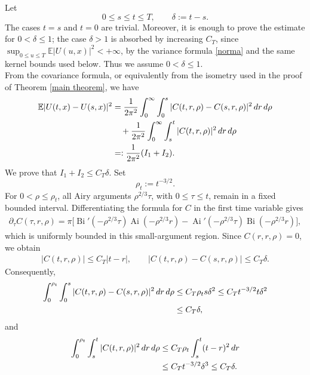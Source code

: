 \documentclass{article}
\newcommand{\Ai}{\operatorname{Ai}}
\newcommand{\Bi}{\operatorname{Bi}}
\begin{document}
Let
\[
  0\le s\le t\le T,
  \qquad
  \delta:=t-s.
\]
The cases \(t=s\) and \(t=0\) are trivial.  Moreover, it is enough to prove the
estimate for \(0<\delta\le1\); the case \(\delta>1\) is absorbed by increasing
\(C_T\), since \(\sup_{0\le u\le T}\mathbb E|U(u,x)|^2<+\infty\), by the variance
formula \eqref{norma} and the same kernel bounds used below.  Thus we assume
\(0<\delta\le1\).\\
From the covariance formula, or equivalently from the isometry used in the
proof of Theorem \ref{main theorem}, we have
\begin{align}
  \mathbb E|U(t,x)-U(s,x)|^2
  &=\frac{1}{2\pi^2}
    \int_0^\infty\int_0^s
    |C(t,r,\rho)-C(s,r,\rho)|^2\,dr\,d\rho          \notag\\
  &\quad
    +\frac{1}{2\pi^2}
    \int_0^\infty\int_s^t
    |C(t,r,\rho)|^2\,dr\,d\rho                         \notag\\
  &=: \frac{1}{2\pi^2}(I_1+I_2).
  \label{eq:variance-split}
\end{align}
We prove that \(I_1+I_2\le C_T\delta\). Set
\[
  \rho_t:=t^{-3/2}.
\]
For \(0<\rho\le \rho_t\), all Airy arguments \(\rho^{2/3}\tau\), with
\(0\le \tau\le t\), remain in a fixed bounded interval.  Differentiating the
formula for \(C\) in the first time variable gives
\begin{align*}
\partial_\tau C(\tau,r,\rho)
 =\pi\Big[\Bi'(-\rho^{2/3}\tau)\Ai(-\rho^{2/3}r)
       -\Ai'(-\rho^{2/3}\tau)\Bi(-\rho^{2/3}r)\Big],
\end{align*}
which is uniformly bounded in this small-argument region.  Since
\(C(r,r,\rho)=0\), we obtain
\begin{align}
  |C(t,r,\rho)|\le C_T|t-r|,
  \qquad
  |C(t,r,\rho)-C(s,r,\rho)|\le C_T\delta.
  \label{eq:small-rho-bounds}
\end{align}
Consequently,
\begin{align}
\int_0^{\rho_t}\int_0^s
|C(t,r,\rho)-C(s,r,\rho)|^2\,dr\,d\rho
&\le C_T\rho_t s\delta^2
 \le C_T t^{-3/2}t\delta^2                    \notag\\
&\le C_T\delta,                                  \label{eq:small-rho-I1}
\end{align}
and
\begin{align}
\int_0^{\rho_t}\int_s^t |C(t,r,\rho)|^2\,dr\,d\rho
&\le C_T\rho_t\int_s^t (t-r)^2\,dr              \notag\\
&\le C_Tt^{-3/2}\delta^3
 \le C_T\delta.                                  \label{eq:small-rho-I2}
\end{align}
\end{document}
